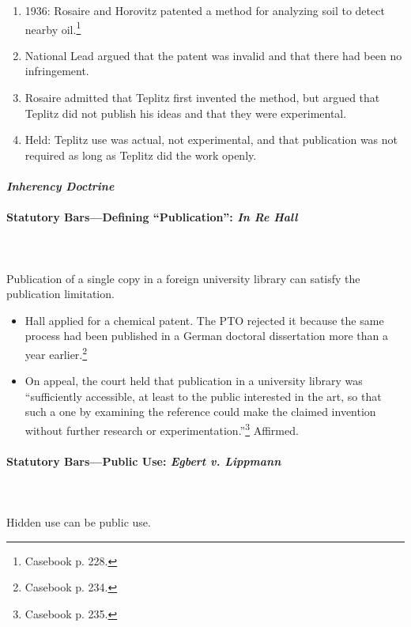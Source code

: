 \begin{enumerate}
    \item 1936: Rosaire and Horovitz patented a method for analyzing soil to 
    detect nearby oil.\footnote{Casebook p. 228.}
    \item National Lead argued that the patent was invalid and that there had 
    been no infringement.
    \item Rosaire admitted that Teplitz first invented the method, but argued 
    that Teplitz did not publish his ideas and that they were experimental.
    \item Held: Teplitz use was actual, not experimental, and that publication 
    was not required as long as Teplitz did the work openly.
\end{enumerate}

\paragraph{\emph{Inherency Doctrine}}


\paragraph{Statutory Bars---Defining ``Publication'': \emph{In Re Hall}}
~\\\\
Publication of a single copy in a foreign university library can satisfy 
the publication limitation.

\begin{itemize}
    \item Hall applied for a chemical patent. The PTO rejected it because the 
    same process had been published in a German doctoral dissertation more than 
    a year earlier.\footnote{Casebook p. 234.}
    \item On appeal, the court held that publication in a university library was 
    ``sufficiently accessible, at least to the public interested in the art, so 
    that such a one by examining the reference could make the claimed invention 
    without further research or experimentation.''\footnote{Casebook p. 235.} 
    Affirmed.
\end{itemize}

\paragraph{Statutory Bars---Public Use: \emph{Egbert v. Lippmann}}
~\\\\
Hidden use can be public use.

